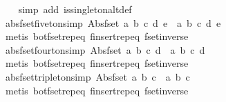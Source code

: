 \begin{isabellebody}
\ \ \isamarkupfalse%
\ {\isacharparenleft}simp\ add{\isacharcolon}\ is{\isacharunderscore}singleton{\isacharunderscore}altdef{\isacharparenright}%
\endisatagproof
{\isafoldproof}%
%
\isadelimproof
\isanewline
%
\endisadelimproof
\isanewline
{}\isamarkupfalse%
\ abs{\isacharunderscore}fset{\isacharunderscore}fiveton{\isacharbrackleft}simp{\isacharbrackright}{\isacharcolon}\ {\isachardoublequoteopen}Abs{\isacharunderscore}fset\ {\isacharbraceleft}a{\isacharcomma}\ b{\isacharcomma}\ c{\isacharcomma}\ d{\isacharcomma}\ e{\isacharbraceright}\ {\isacharequal}\ {\isacharbraceleft}{\isacharbar}a{\isacharcomma}\ b{\isacharcomma}\ c{\isacharcomma}\ d{\isacharcomma}\ e{\isacharbar}{\isacharbraceright}{\isachardoublequoteclose}\isanewline
%
\isadelimproof
\ \ %
\endisadelimproof
%
\isatagproof
{}\isamarkupfalse%
\ {\isacharparenleft}metis\ bot{\isacharunderscore}fset{\isachardot}rep{\isacharunderscore}eq\ finsert{\isachardot}rep{\isacharunderscore}eq\ fset{\isacharunderscore}inverse{\isacharparenright}%
\endisatagproof
{\isafoldproof}%
%
\isadelimproof
\isanewline
%
\endisadelimproof
\isanewline
{}\isamarkupfalse%
\ abs{\isacharunderscore}fset{\isacharunderscore}fourton{\isacharbrackleft}simp{\isacharbrackright}{\isacharcolon}\ {\isachardoublequoteopen}Abs{\isacharunderscore}fset\ {\isacharbraceleft}a{\isacharcomma}\ b{\isacharcomma}\ c{\isacharcomma}\ d{\isacharbraceright}\ {\isacharequal}\ {\isacharbraceleft}{\isacharbar}a{\isacharcomma}\ b{\isacharcomma}\ c{\isacharcomma}\ d{\isacharbar}{\isacharbraceright}{\isachardoublequoteclose}\isanewline
%
\isadelimproof
\ \ %
\endisadelimproof
%
\isatagproof
{}\isamarkupfalse%
\ {\isacharparenleft}metis\ bot{\isacharunderscore}fset{\isachardot}rep{\isacharunderscore}eq\ finsert{\isachardot}rep{\isacharunderscore}eq\ fset{\isacharunderscore}inverse{\isacharparenright}%
\endisatagproof
{\isafoldproof}%
%
\isadelimproof
\isanewline
%
\endisadelimproof
\isanewline
{}\isamarkupfalse%
\ abs{\isacharunderscore}fset{\isacharunderscore}tripleton{\isacharbrackleft}simp{\isacharbrackright}{\isacharcolon}\ {\isachardoublequoteopen}Abs{\isacharunderscore}fset\ {\isacharbraceleft}a{\isacharcomma}\ b{\isacharcomma}\ c{\isacharbraceright}\ {\isacharequal}\ {\isacharbraceleft}{\isacharbar}a{\isacharcomma}\ b{\isacharcomma}\ c{\isacharbar}{\isacharbraceright}{\isachardoublequoteclose}\isanewline
%
\isadelimproof
\ \ %
\endisadelimproof
%
\isatagproof
{}\isamarkupfalse%
\ {\isacharparenleft}metis\ bot{\isacharunderscore}fset{\isachardot}rep{\isacharunderscore}eq\ finsert{\isachardot}rep{\isacharunderscore}eq\ fset{\isacharunderscore}inverse{\isacharparenright}%

\end{isabellebody}
